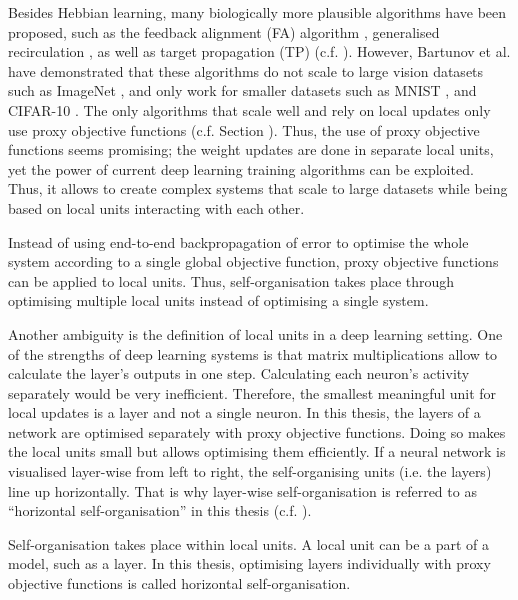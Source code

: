Besides Hebbian learning, many biologically more plausible algorithms have been proposed, such as the feedback alignment (FA) algorithm , generalised recirculation , as well as target propagation (TP)  (c.f. ).
However, Bartunov et al.  have demonstrated that these algorithms do not scale to large vision datasets such as ImageNet \cite{deng2009imagenet}, and only work for smaller datasets such as MNIST \cite{MNIST}, and CIFAR-10 \cite{cifar_10}.
The only algorithms that scale well and rely on local updates only use proxy objective functions (c.f. Section ).
Thus, the use of proxy objective functions seems promising; the weight updates are done in separate local units, yet the power of current deep learning training algorithms can be exploited. Thus, it allows to create complex systems that scale to large datasets while being based on local units interacting with each other.

\begin{implementation}
	Instead of using end-to-end backpropagation of error to optimise the whole system according to a single global objective function, proxy objective functions can be applied to local units. Thus, self-organisation takes place through optimising multiple local units instead of optimising a single system.
\end{implementation}

Another ambiguity is the definition of local units in a deep learning setting.
One of the strengths of deep learning systems is that matrix multiplications allow to calculate the layer's outputs in one step.
Calculating each neuron's activity separately would be very inefficient.
Therefore, the smallest meaningful unit for local updates is a layer and not a single neuron.
In this thesis, the layers of a network are optimised separately with proxy objective functions. Doing so makes the local units small but allows optimising them efficiently.
If a neural network is visualised layer-wise from left to right, the self-organising units (i.e. the layers) line up horizontally. That is why layer-wise self-organisation is referred to as ``horizontal self-organisation'' in this thesis (c.f. ).

\begin{implementation}
	Self-organisation takes place within local units. A local unit can be a part of a model, such as a layer.
	In this thesis,  optimising layers individually with proxy objective functions is called horizontal self-organisation.
\end{implementation}

